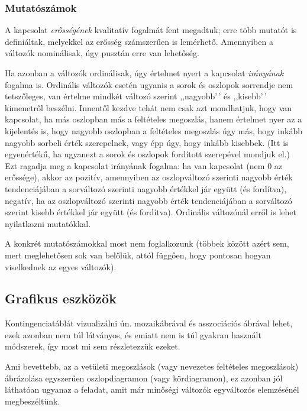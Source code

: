 \documentclass[
]{book}
\begin{document}
\hypertarget{deskriptivminketvaltanalitikusmutatoszamok}{%
\subsubsection{Mutatószámok}\label{deskriptivminketvaltanalitikusmutatoszamok}}

A kapcsolat \emph{erősségének} kvalitatív fogalmát fent megadtuk; erre több mutatót is definiáltak, melyekkel az erősség számszerűen is lemérhető. Amennyiben a változók nominálisak, úgy pusztán erre van lehetőség.

Ha azonban a változók ordinálisak, úgy értelmet nyert a kapcsolat \emph{irányának} fogalma is. Ordinális változók esetén ugyanis a sorok és oszlopok sorrendje nem tetszőleges, van értelme mindkét változó szerint ,,nagyobb'\,' és ,,kisebb'\,' kimenetről beszélni. Innentől kezdve tehát nem csak azt mondhatjuk, hogy van kapcsolat, ha más oszlopban más a feltételes megoszlás, hanem értelmet nyer az a kijelentés is, hogy nagyobb oszlopban a feltételes megoszlás úgy más, hogy inkább nagyobb sorbeli érték szerepelnek, vagy épp úgy, hogy inkább kisebbek. (Itt is egyenértékű, ha ugyanezt a sorok és oszlopok fordított szerepével mondjuk el.) Ezt ragadja meg a kapcsolat irányának fogalma: ha van kapcsolat (nem 0 az erőssége), akkor az pozitív, amennyiben az oszlopváltozó szerinti nagyobb érték tendenciájában a sorváltozó szerinti nagyobb értékkel jár együtt (és fordítva), negatív, ha az oszlopváltozó szerinti nagyobb érték tendenciájában a sorváltozó szerint kisebb értékkel jár együtt (és fordítva). Ordinális változónál erről is lehet nyilatkozni mutatókkal.

A konkrét mutatószámokkal most nem foglalkozunk (többek között azért sem, mert meglehetősen sok van belőlük, attól függően, hogy pontosan hogyan viselkednek az egyes változók).

\hypertarget{deskriptivminketvaltgrafikus}{%
\subsection{Grafikus eszközök}\label{deskriptivminketvaltgrafikus}}

Kontingenciatáblát vizualizálni ún. mozaikábrával és asszociációs ábrával lehet, ezek azonban nem túl látványos, és emiatt nem is túl gyakran használt módszerek, így most mi sem részletezzük ezeket.

Ami bevettebb, az a vetületi megoszlások (vagy nevezetes feltételes megoszlások) ábrázolása egyszerűen oszlopdiagramon (vagy kördiagramon), ez azonban jól láthatóan ugyanaz a feladat, amit már minőségi változók egyváltozós elemzésénél megbeszéltünk.
\end{document}
